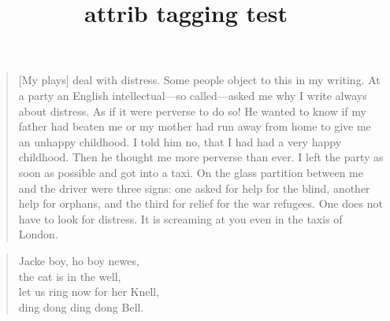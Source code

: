 \documentclass{article}
\title{attrib tagging test}
\begin{document}
\begin{quotation}
[My plays] deal with distress. Some people object to this in my writing.
At a party an English intellectual---so called---asked me why I write always
about distress. As if it were perverse to do so! He wanted to know if my
father had beaten me or my mother had run away from home to give me an
unhappy childhood. I told him no, that I had had a very happy childhood.
Then he thought me more perverse than ever. I left the party as soon as
possible and got into a taxi. On the glass partition between me and the
driver were three signs: one asked for help for the blind, another help for
orphans, and the third for relief for the war refugees. One does not have to
look for distress. It is screaming at you even in the taxis of London.
\end{quotation}

\begin{verse}
Jacke boy, ho boy newes,\\
\quad the cat is in the well,\\
let us ring now for her Knell,\\
\quad ding dong ding dong Bell.
\end{verse}
\end{document}

